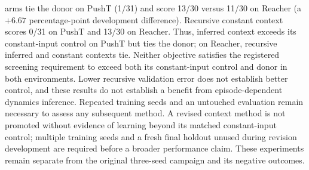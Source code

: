 arms tie the donor on PushT (1/31) and score 13/30 versus 11/30 on Reacher
(a $+6.67$ percentage-point development difference). Recursive constant
context scores 0/31 on PushT and 13/30 on Reacher. Thus, inferred context
exceeds its constant-input control on PushT but ties the donor; on Reacher,
recursive inferred and constant contexts tie. Neither objective satisfies
the registered screening requirement to exceed both its constant-input
control and donor in both environments. Lower recursive validation error
does not establish better control, and these results do not establish a
benefit from episode-dependent dynamics inference. Repeated training seeds
and an untouched evaluation remain necessary to assess any subsequent method.
A revised context method is not promoted without evidence of learning beyond
its matched constant-input control; multiple training seeds and a fresh final
holdout unused during revision development are required before a broader
performance claim. These experiments remain separate from the original
three-seed campaign and its negative outcomes.

